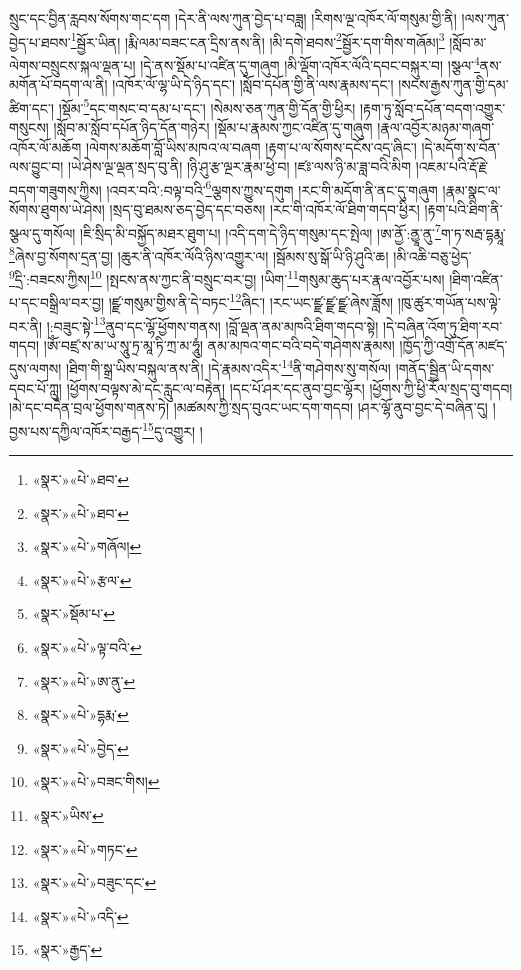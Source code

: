 སྲུང་དང་བྱིན་རླབས་སོགས་གང་དག །དེར་ནི་ལས་ཀུན་བྱེད་པ་བཟླ། །རིགས་ལྔ་འཁོར་ལོ་གསུམ་གྱི་ནི། །ལས་ཀུན་བྱེད་པ་ཐབས་\footnote{«སྣར་»«པེ་»ཐབ་}སྦྱོར་ཡིན། །རྨི་ལམ་བཟང་ངན་དྲིས་ནས་ནི། །མི་དགེ་ཐབས་\footnote{«སྣར་»«པེ་»ཐབ་}སྦྱོར་དག་གིས་གཞོམ།\footnote{«སྣར་»«པེ་»གཞོལ།} །སློབ་མ་ལེགས་བསྲུངས་སྐལ་ལྡན་པ། །དེ་ནས་སྡོམ་པ་འཛིན་དུ་གཞུག །མི་ལྡོག་འཁོར་ལོའི་དབང་བསྐུར་བ། །སྩལ་\footnote{«སྣར་»«པེ་»རྩལ་}ནས་མགོན་པོ་བདག་ལ་ནི། །འཁོར་ལོ་ལྷ་ཡི་དེ་ཉིད་དང་། །སློབ་དཔོན་གྱི་ནི་ལས་རྣམས་དང་། །སངས་རྒྱས་ཀུན་གྱི་དམ་ཚིག་དང་། །སྡོམ་\footnote{«སྣར་»སྡོམ་པ་}དང་གསང་བ་དམ་པ་དང་། །སེམས་ཅན་ཀུན་གྱི་དོན་གྱི་ཕྱིར། །རྟག་ཏུ་སློབ་དཔོན་བདག་འགྱུར་གསུངས། །སློབ་མ་སློབ་དཔོན་ཉིད་དོན་གཉེར། །སྡོམ་པ་རྣམས་ཀྱང་འཛིན་དུ་གཞུག །རྣལ་འབྱོར་མཉམ་གཞག་འཁོར་ལོ་མཆོག །ལེགས་མཆོག་བློ་ཡིས་མཁའ་ལ་བཞག །རྟག་པ་ལ་སོགས་དངོས་འདྲ་ཞིང་། །དེ་མདོག་ས་བོན་ལས་བྱུང་བ། །ཡེ་ཤེས་ལྔ་ལྡན་སྲད་བུ་ནི། །ཉི་ཤུ་རྩ་ལྔར་རྣམ་ཕྱེ་བ། །ཛཿ་ལས་ཉི་མ་ཟླ་བའི་མིག །འཇམ་པའི་རྡོ་རྗེ་བདག་གཟུགས་ཀྱིས། །འབར་བའི་:བལྟ་བའི་\footnote{«སྣར་»«པེ་»ལྟ་བའི་}ལྕགས་ཀྱུས་དགུག །རང་གི་མདོག་ནི་ནང་དུ་གཞུག །རྣམ་སྣང་ལ་སོགས་ཐུགས་ཡེ་ཤེས། །སྲད་བུ་ཐམས་ཅད་བྱེད་དང་བཅས། །རང་གི་འཁོར་ལོ་ཐིག་གདབ་ཕྱིར། །རྟག་པའི་ཐིག་ནི་སྩལ་དུ་གསོལ། །ཇི་སྲིད་མི་བསྐྱོད་མཐར་ཐུག་པ། །འདི་དག་དེ་ཉིད་གསུམ་དང་སྤེལ། །ཨ་ནྱོ་:ནྱཱ་ནུ་\footnote{«སྣར་»«པེ་»ཨ་ནུ་}ག་ཏ་སརྦ་དྷརྨཱ་\footnote{«སྣར་»«པེ་»དྷརྨ་}ཞེས་བྱ་སོགས་དྲན་བྱ། །ཆུར་ནི་འཁོར་ལོའི་ཉིས་འགྱུར་ལ། །སྦོམས་སུ་སྒོ་ཡི་ཉི་ཤུའི་ཆ། །མི་འཆི་བཅུ་ཕྱེད་\footnote{«སྣར་»«པེ་»བྱེད་}དྲི་:བཟངས་ཀྱིས།\footnote{«སྣར་»«པེ་»བཟང་གིས།} །སྤངས་ནས་ཀྱང་ནི་བསྲུང་བར་བྱ། །ཡིག་\footnote{«སྣར་»ཡིས་}གསུམ་ཆུད་པར་རྣལ་འབྱོར་པས། །ཐིག་འཛིན་པ་དང་བསྒྲིལ་བར་བྱ། །ཛྫ་གསུམ་གྱིས་ནི་དེ་བཏང་\footnote{«སྣར་»«པེ་»གཏང་}ཞིང་། །རང་ཡང་ཛྫ་ཛྫ་ཛྫ་ཞེས་ཟློས། །ཁུ་ཚུར་གཡོན་པས་ལྟེ་བར་ནི། །:བཟུང་སྟེ་\footnote{«སྣར་»«པེ་»བཟུང་དང་}ནུབ་དང་ལྷོ་ཕྱོགས་གནས། །བློ་ལྡན་ནམ་མཁའི་ཐིག་གདབ་སྟེ། །དེ་བཞིན་འོག་ཏུ་ཐིག་རབ་གདབ། །ཨོཾ་བཛྲ་ས་མ་ཡ་སཱུ་ཏྲ་མཱ་ཏི་ཀྲ་མ་ཧཱུཾ། ནམ་མཁའ་གང་བའི་བདེ་གཤེགས་རྣམས། །ཁྱོད་ཀྱི་འགྲོ་དོན་མཛད་དུས་ལགས། །ཐིག་གི་སྒྲ་ཡིས་བསྐུལ་ནས་ནི། །དེ་རྣམས་འདིར་\footnote{«སྣར་»«པེ་»འདི་}ནི་གཤེགས་སུ་གསོལ། །གནོད་སྦྱིན་ཡི་དགས་དབང་པོ་ཀླུ། །ཕྱོགས་བལྟས་མེ་དང་རླུང་ལ་བརྟེན། །དང་པོ་ཤར་དང་ནུབ་བྱང་ལྷོར། །ཕྱོགས་ཀྱི་ཕྱི་རོལ་སྲད་བུ་གདབ། །མེ་དང་བདེན་བྲལ་ཕྱོགས་གནས་ཏེ། །མཚམས་ཀྱི་སྲད་བུའང་ཡང་དག་གདབ། །ཤར་ལྷོ་ནུབ་བྱང་དེ་བཞིན་དུ། །བྱས་པས་དཀྱིལ་འཁོར་བརྒྱད་\footnote{«སྣར་»རྒྱད་}དུ་འགྱུར། །
